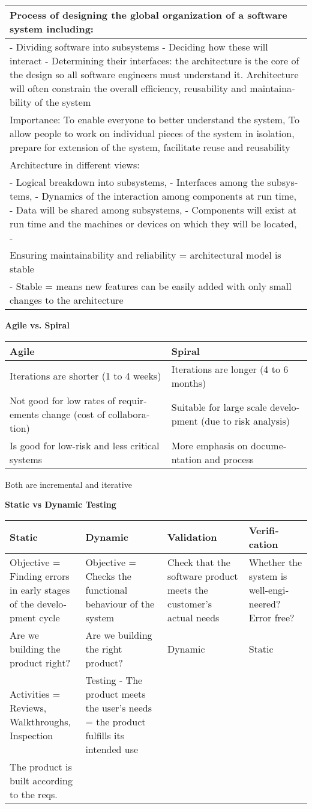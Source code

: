 \begin{longtable}[]{@{}l@{}}
	\toprule
	Process of designing the global organi­zation of a software system
	including:\tabularnewline
	\midrule
	\endhead
	- Dividing software into subsystems - Deciding how these will interact -
	Determ­ining their interf­aces: the archit­ecture is the core of the
	design so all software engineers must understand it. Archit­ecture will
	often constrain the overall effici­ency, reusab­ility and
	mainta­ina­bility of the system\tabularnewline
	Import­ance: To enable everyone to better understand the system, To
	allow people to work on individual pieces of the system in isolation,
	prepare for extension of the system, facilitate reuse and
	reusab­ility\tabularnewline
	Archit­ecture in different views:\tabularnewline
	- Logical breakdown into subsys­tems, - Interfaces among the
	subsys­tems, - Dynamics of the intera­ction among components at run
	time, - Data will be shared among subsys­tems, - Components will exist
	at run time and the machines or devices on which they will be located,
	-\tabularnewline
	Ensuring mainta­ina­bility and reliab­ility = archit­ectural model is
	stable\tabularnewline
	- Stable = means new features can be easily added with only small
	changes to the archit­ecture\tabularnewline
	\bottomrule
\end{longtable}

\textbf{Agile vs. Spiral}\label{agile-vs.-spiral}

\begin{longtable}[]{@{}ll@{}}
	\toprule
	Agile & Spiral\tabularnewline
	\midrule
	\endhead
	Iterations are shorter (1 to 4 weeks) & Iterations are longer (4 to 6
	months)\tabularnewline
	Not good for low rates of requir­ements change (cost of collab­ora­tion)
	& Suitable for large scale develo­pment (due to risk
	analysis)\tabularnewline
	Is good for low-risk and less critical systems & More emphasis on
	docume­ntation and process\tabularnewline
	\bottomrule
\end{longtable}

Both are increm­ental and iterative

\textbf{Static vs Dynamic
	Testing}\label{static-vs-dynamic-testing}

\begin{longtable}[]{@{}llll@{}}
	\toprule
	Static & Dynamic & Validation & Verifi­cation\tabularnewline
	\midrule
	\endhead
	Objective = Finding errors in early stages of the develo­pment cycle &
	Objective = Checks the functional behaviour of the system & Check that
	the software product meets the customer's actual needs & Whether the
	system is well-e­ngi­neered? Error free?\tabularnewline
	Are we building the product right? & Are we building the right product?
	& Dynamic & Static\tabularnewline
	Activities = Reviews, Walkth­roughs, Inspection & Testing - The product
	meets the user's needs = the product fulfills its intended
	use\tabularnewline
	The product is built according to the reqs.\tabularnewline
	\bottomrule
\end{longtable}


